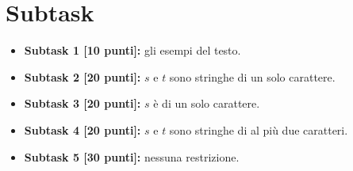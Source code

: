   \section*{Subtask}
  \begin{itemize}
    \item \textbf{Subtask 1 [10 punti]:} gli esempi del testo.
    \item \textbf{Subtask 2 [20 punti]:} $s$ e $t$ sono stringhe di un solo carattere.
    \item \textbf{Subtask 3 [20 punti]:} $s$ è di un solo carattere.
    \item \textbf{Subtask 4 [20 punti]:} $s$ e $t$ sono stringhe di al più due caratteri.
    \item \textbf{Subtask 5 [30 punti]:} nessuna restrizione.
  \end{itemize}
  
